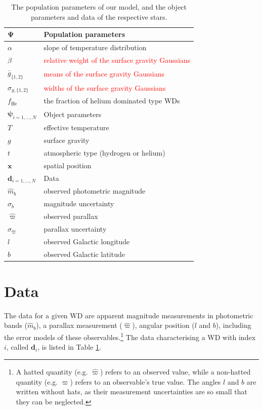 \documentclass[fleqn,usenatbib]{mnras}
\newcommand{\changes}[1]{\textcolor{red}{#1}}
\newcommand{\popp}{\boldsymbol{\Psi}}
\newcommand{\objp}{\boldsymbol{\psi}}
\newcommand{\data}{\mathbf{d}}
\newcommand{\Teff}{T}
\newcommand{\logg}{g}
\begin{document}
\begin{table}
	\centering
	\caption{The population parameters of our model, and the object parameters and data of the respective stars.}
	\label{tab:parameters}
    \begin{tabular}{l l}
		\hline
		$\popp$  & Population parameters \\
		\hline
		$\alpha$ & slope of temperature distribution \\
		$\beta$ & \changes{relative weight of the surface gravity Gaussians} \\
		$\bar{g}_{\{1,2\}}$ & \changes{means of the surface gravity Gaussians} \\
		$\sigma_{g,\{1,2\}}$ & \changes{widths of the surface gravity Gaussians} \\
		$f_\text{He}$ & the fraction of helium dominated type WDs \\
        \hline
        $\objp_{i=1,...,N}$  & Object parameters \\
        \hline
        $\Teff$ & effective temperature \\
        $\logg$ & surface gravity \\
        $t$ & atmospheric type (hydrogen or helium) \\
        $\mathbf{x}$ & spatial position  \\
        \hline
        $\data_{i=1,...,N}$ & Data \\
        \hline
        $\hat{m}_b$ & observed photometric magnitude \\
        $\sigma_b$ & magnitude uncertainty \\
        $\hat{\varpi}$ & observed parallax \\
        $\sigma_{\hat{\varpi}}$ & parallax uncertainty \\
        $l$ & observed Galactic longitude \\
        $b$ & observed Galactic latitude \\
		\hline
	\end{tabular}
\end{table}




\section{Data}\label{sec:data}

The data for a given WD are apparent magnitude measurements in photometric bands ($\hat{m}_b$), a parallax measurement ($\hat{\varpi}$), angular position ($l$ and $b$), including the error models of these observables.\footnote{A hatted quantity (e.g. $\hat{\varpi}$) refers to an observed value, while a non-hatted quantity (e.g. $\varpi$) refers to an observable's true value. The angles $l$ and $b$ are written without hats, as their measurement uncertainties are so small that they can be neglected.} The data characterising a WD with index $i$, called $\data_i$, is listed in Table \ref{tab:parameters}.
\end{document}
